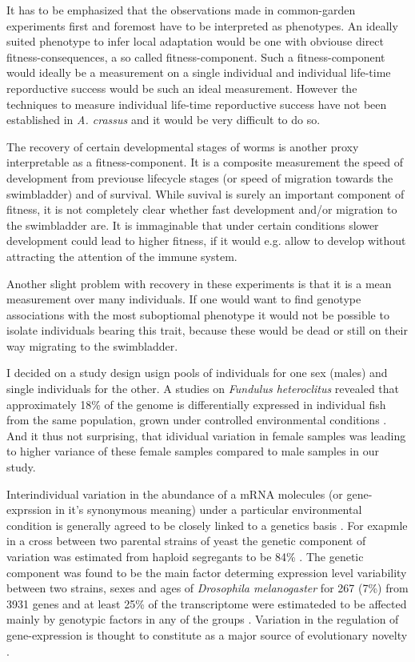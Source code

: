 It has to be emphasized that the observations made in common-garden
experiments first and foremost have to be interpreted as
phenotypes. An ideally suited phenotype to infer local adaptation
would be one with obviouse direct fitness-consequences, a so called
fitness-component. Such a fitness-component would ideally be a
measurement on a single individual and individual life-time
reporductive success would be such an ideal measurement. However the
techniques to measure individual life-time reporductive success have
not been established in \textit{A. crassus} and it would be very
difficult to do so.

The recovery of certain developmental stages of worms is another proxy
interpretable as a fitness-component. It is a composite measurement
the speed of development from previouse lifecycle stages (or speed of
migration towards the swimbladder) and of survival. While suvival is
surely an important component of fitness, it is not completely clear
whether fast development and/or migration to the swimbladder are. It
is immaginable that under certain conditions slower development could
lead to higher fitness, if it would e.g. allow to develop without
attracting the attention of the immune system.

Another slight problem with recovery in these experiments is that it
is a mean measurement over many individuals. If one would want to find
genotype associations with the most suboptiomal phenotype it would not
be possible to isolate individuals bearing this trait, because these
would be dead or still on their way migrating to the swimbladder.

I decided on a study design usign pools of individuals for one sex
(males) and single individuals for the other. A studies on
\textit{Fundulus heteroclitus} revealed that approximately 18\% of the
genome is differentially expressed in individual fish from the same
population, grown under controlled environmental conditions
\cite{pmid12219088}. And it thus not surprising, that idividual
variation in female samples was leading to higher variance of these
female samples compared to male samples in our study.

Interindividual variation in the abundance of a mRNA molecules (or
gene-exprssion in it's synonymous meaning) under a particular
environmental condition is generally agreed to be closely linked to a
genetics basis \cite{pmid15498452}. For exapmle in a cross between two
parental strains of yeast the genetic component of variation was
estimated from haploid segregants to be 84\% \cite{pmid11923494}. The
genetic component was found to be the main factor determing expression
level variability between two strains, sexes and ages of
\textit{Drosophila melanogaster} for 267 (7\%) from 3931 genes and at
least 25\% of the transcriptome were estimateded to be affected mainly
by genotypic factors in any of the groups
\cite{pmid11726925}. Variation in the regulation of gene-expression is
thought to constitute as a major source of evolutionary novelty
\cite{pmid11341673}.

